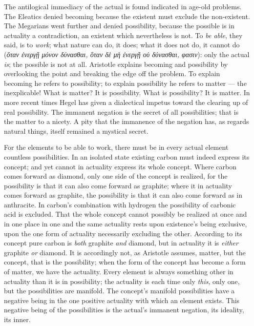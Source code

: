 \documentclass[12pt,a4paper]{book}
\begin{document}
The antilogical immediacy of the actual is found indicated in age-old problems. The Eleatics denied becoming because
the existent must exclude the non-existent. The Megarians went further and denied possibility, because the possible
is in actuality a contradiction, an existent which nevertheless is not. To
\emph{be able}, they said, is to \emph{work}; what nature can do, it does; what it does not do, it cannot do
(\textit{ὅταν ἐνεργῇ μόνον δύνασθαι, ὅταν δὲ μὴ ἐνεργῇ οὐ δύνασθαι, φασιν}): only the actual \emph{is}; the possible
is not at all. Aristotle explains becoming and possibility by overlooking the point and breaking the edge off the
problem. To explain becoming he refers to possibility; to explain possibility he refers to matter --- the
inexplicable! What is matter? It is possibility. What is possibility? It is matter. In more recent times Hegel has
given a dialectical impetus toward the clearing up of real possibility. The immanent negation is the secret of all
possibilities; that is the matter to a nicety. A pity that the immanence of the negation has, as regards natural
things, itself remained a mystical secret.

For the elements to be able to work, there must be in every actual element countless possibilities. In an isolated
state existing carbon must indeed express its concept; and yet cannot in actuality express its whole concept. Where
carbon comes forward as diamond, only one side of the concept is realized, for the possibility is that it can also
come forward as graphite; where it in actuality comes forward
as graphite, the possibility is that it can also come forward as in anthracite. In carbon's combination with
hydrogen the possibility of carbonic acid is excluded. That the whole concept cannot possibly be realized at once and
in one place in one and the same actuality rests upon existence's being exclusive, upon the one form of actuality
necessarily excluding the other. According to its concept pure carbon is \emph{both} graphite \emph{and} diamond, but
in actuality it is \emph{either} graphite \emph{or} diamond. It is accordingly not, as Aristotle assumes, matter, but
the concept, that is the possibility; when the form of the concept has become a form of matter, we have the actuality.
Every element is always something other in actuality than it is in possibility; the actuality is each time only
\emph{this}, only one, but the possibilities are manifold. The concept's manifold possibilities have a negative being
in the one positive actuality with which an element exists. This negative being of the possibilities is the actual's
immanent negation, its ideality, its inner.
\end{document}
